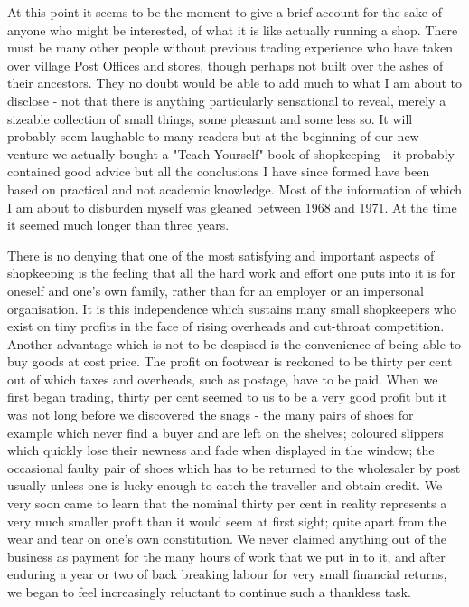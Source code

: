 
At this point it seems to be the moment to give a brief account for the sake of anyone who might be interested, of what it is like actually running a shop. There must be many other people without previous trading experience who have taken over village Post Offices and stores, though perhaps not built over the ashes of their ancestors. They no doubt would be able to add much to what I am about to disclose - not that there is anything particularly sensational to reveal, merely a sizeable collection of small things, some pleasant and some less so. It will probably seem laughable to many readers but at the beginning of our new venture we actually bought a "Teach Yourself" book of shopkeeping - it probably contained good advice but all the conclusions I have since formed have been based on practical and not academic knowledge. Most of the information of which I am about to disburden myself was gleaned between 1968 and 1971. At the time it seemed much longer than three years.

There is no denying that one of the most satisfying and important aspects of shopkeeping is the feeling that all the hard work and effort one puts into it is for oneself and one's own family, rather than for an employer or an impersonal organisation. It is this independence which sustains many small shopkeepers who exist on tiny profits in the face of rising overheads and cut-throat competition. Another advantage which is not to be despised is the convenience of being able to buy goods at cost price. The profit on footwear is reckoned to be thirty per cent out of which taxes and overheads, such as postage, have to be paid. When we first began trading, thirty per cent seemed to us to be a very good profit but it was not long before we discovered the snags - the many pairs of shoes for example which never find a buyer and are left on the shelves; coloured slippers which quickly lose their newness and fade when displayed in the window; the occasional faulty pair of shoes which has to be returned to the wholesaler by post usually unless one is lucky enough to catch the traveller and obtain credit. We very soon came to learn that the nominal thirty per cent in reality represents a very much smaller profit than it would seem at first sight; quite apart from the wear and tear on one’s own constitution. We never claimed anything out of the business as payment for the many hours of work that we put in to it, and after enduring a year or two of back breaking labour for very small financial returns, we began to feel increasingly reluctant to continue such a thankless task.

